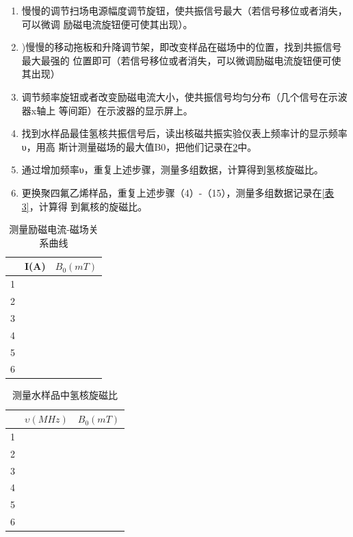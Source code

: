 \documentclass{ctexart}
\begin{document}
\begin{enumerate}[(1)]
		\item 慢慢的调节扫场电源幅度调节旋钮，使共振信号最大（若信号移位或者消失，可以微调
		励磁电流旋钮便可使其出现）。
		\item )慢慢的移动拖板和升降调节架，即改变样品在磁场中的位置，找到共振信号最大最强的
		位置即可（若信号移位或者消失，可以微调励磁电流旋钮便可使其出现）
		\item 调节频率旋钮或者改变励磁电流大小，使共振信号均匀分布（几个信号在示波器x轴上
		等间距）在示波器的显示屏上。
		\item 找到水样品最佳氢核共振信号后，读出核磁共振实验仪表上频率计的显示频率υ，用高 斯计测量磁场的最大值B0，把他们记录在\ref{表2}中。
		\item 通过增加频率υ，重复上述步骤，测量多组数据，计算得到氢核旋磁比。
		\item 更换聚四氟乙烯样品，重复上述步骤（4）-（15），测量多组数据记录在\ref{表3}，计算得
		到氟核的旋磁比。
	\end{enumerate}

	
	\begin{table}[H]
		\caption{测量励磁电流-磁场关系曲线}\label{表1}
		\centering
		\begin{tabular}{| c | p{4cm} | p{4cm} |}
		\hline
		 & I(A) & $B_0(mT)$ \\
		\hline
		1 &  &   \\
		\hline
		2 &  &   \\
		\hline
		3 &  &   \\
		\hline
		4 &  &   \\
		\hline
		5 &  &   \\
		\hline
		6 &  &   \\
		\hline
	\end{tabular}
\end{table}
	
	\begin{table}[H]
		\centering
		\caption{测量水样品中氢核旋磁比}
		\label{表2}
	\begin{tabular}{| c | p{4cm} | p{4cm} |}
		\hline
		& $\upsilon(MHz)$ & $B_0(mT)$ \\
		\hline
		1 &  &   \\
		\hline
		2 &  &   \\
		\hline
		3 &  &   \\
		\hline
		4 &  &   \\
		\hline
		5 &  &   \\
		\hline
		6 &  &   \\
		\hline
	\end{tabular}
\end{table}
\end{document}
